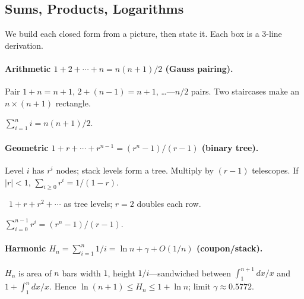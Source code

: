 \subsection{Sums, Products, Logarithms}
We build each closed form from a picture, then state it. Each box is a 3-line derivation.
\paragraph{Arithmetic $1+2+\cdots+n=n(n+1)/2$ (Gauss pairing).}
Pair $1+n=n+1$, $2+(n-1)=n+1$, \dots---$n/2$ pairs. Two staircases make an $n\times(n+1)$ rectangle.
\begin{center}
$\displaystyle\sum_{i=1}^{n}i=n(n+1)/2$.
\end{center}
\paragraph{Geometric $1+r+\cdots+r^{n-1}=(r^n-1)/(r-1)$ (binary tree).}
Level $i$ has $r^i$ nodes; stack levels form a tree. Multiply by $(r-1)$ telescopes. If $|r|<1$, $\sum_{i\ge0}r^i=1/(1-r)$.
\begin{center}
\ {\scriptsize $1+r+r^2+\cdots$ as tree levels; $r=2$ doubles each row.}
\end{center}
$\displaystyle\sum_{i=0}^{n-1}r^i=(r^n-1)/(r-1)$.
\paragraph{Harmonic $H_n=\sum_{i=1}^{n}1/i=\ln n+\gamma+O(1/n)$ (coupon/stack).}
$H_n$ is area of $n$ bars width $1$, height $1/i$---sandwiched between $\int_1^{n+1}\!dx/x$ and $1+\int_1^n\!dx/x$. Hence $\ln(n+1)\le H_n\le1+\ln n$; limit $\gamma\approx0.5772$.

